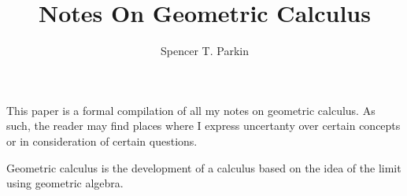 \documentclass[12pt]{article}
\title{Notes On Geometric Calculus}
\author{Spencer T. Parkin}
\begin{document}
\maketitle

This paper is a formal compilation of all my notes on geometric calculus.
As such, the reader may find places where I express uncertanty
over certain concepts or in consideration of certain questions.

Geometric calculus is the development of a calculus based on the idea of the limit
using geometric algebra.
\end{document}
